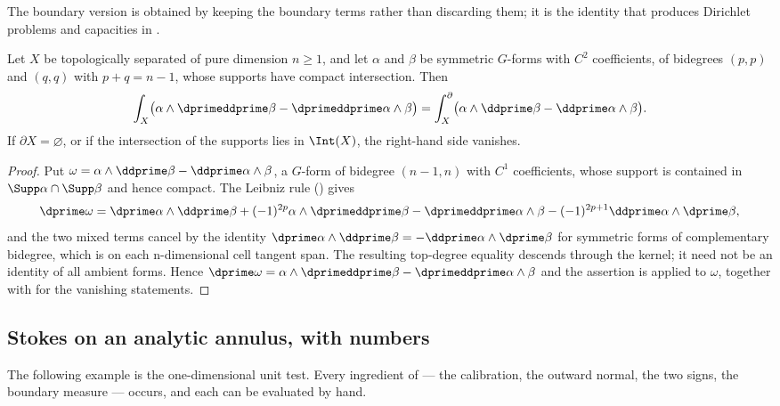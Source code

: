The boundary version is obtained by keeping the boundary terms rather than
discarding them; it is the identity that produces Dirichlet problems and
capacities in .

\begin{theorem}
\label{thm:ch13-green-boundary}
Let $X$ be topologically separated of pure dimension $n\ge1$, and let
$\alpha$ and $\beta$ be
symmetric $G$-forms with $C^2$ coefficients, of bidegrees
$(p,p)$ and $(q,q)$ with $p+q=n-1$, whose supports have compact
intersection.  Then
\[
 \int_X\bigl(\alpha\wedge\dprimeddprime\beta
              -\dprimeddprime\alpha\wedge\beta\bigr)
 =\int_X^{\partial}\bigl(\alpha\wedge\ddprime\beta
                          -\ddprime\alpha\wedge\beta\bigr).
\]
If $\partial X=\varnothing$, or if the intersection of the supports lies in
$\Int(X)$, the right-hand side vanishes.
\end{theorem}

\begin{proof}
Put $\omega=\alpha\wedge\ddprime\beta-\ddprime\alpha\wedge\beta$, a $G$-form
of bidegree $(n-1,n)$ with $C^1$ coefficients, whose support is contained in
$\Supp\alpha\cap\Supp\beta$ and hence compact.  The Leibniz rule
() gives
\[
 \dprime\omega
 =\dprime\alpha\wedge\ddprime\beta
  +(-1)^{2p}\alpha\wedge\dprimeddprime\beta
  -\dprimeddprime\alpha\wedge\beta
  -(-1)^{2p+1}\ddprime\alpha\wedge\dprime\beta,
\]
and the two mixed terms cancel by the identity
$\dprime\alpha\wedge\ddprime\beta=-\ddprime\alpha\wedge\dprime\beta$ for
symmetric forms of complementary bidegree, which is
 on each n-dimensional cell tangent
span.  The resulting top-degree equality descends through the kernel;
it need not be an identity of all ambient forms.  Hence
$\dprime\omega=\alpha\wedge\dprimeddprime\beta-\dprimeddprime\alpha\wedge\beta$
and the assertion is  applied to $\omega$, together
with  for the vanishing statements.
\end{proof}

\subsection{Stokes on an analytic annulus, with numbers}
\label{sec:ch13-stokes-annulus}

The following example is the one-dimensional unit test.  Every ingredient of
 --- the calibration, the outward normal, the two
signs, the boundary measure --- occurs, and each can be evaluated by hand.

